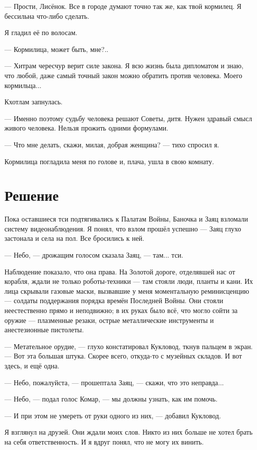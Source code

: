 --- Прости, Лисёнок.
Все в городе думают точно так же, как твой кормилец.
Я бессильна что-либо сделать.

Я гладил её по волосам.

--- Кормилица, может быть, мне?..

--- Хитрам чересчур верит силе закона.
Я всю жизнь была дипломатом и знаю, что любой, даже самый точный закон можно обратить против человека.
Моего кормильца...

Кхотлам запнулась.

--- Именно поэтому судьбу человека решают Советы, дитя.
Нужен здравый смысл живого человека.
Нельзя прожить одними формулами.

--- Что мне делать, скажи, милая, добрая женщина? --- тихо спросил я.

Кормилица погладила меня по голове и, плача, ушла в свою комнату.

\section{Решение}

Пока оставшиеся тси подтягивались к Палатам Войны, Баночка и Заяц взломали систему видеонаблюдения.
Я понял, что взлом прошёл успешно --- Заяц глухо застонала и села на пол.
Все бросились к ней.

--- Небо, --- дрожащим голосом сказала Заяц, --- там... тси.

Наблюдение показало, что она права.
На Золотой дороге, отделявшей нас от корабля, ждали не только роботы-техники --- там стояли люди, планты и кани.
Их лица скрывали газовые маски, вызвавшие у меня моментальную реминисценцию --- солдаты поддержания порядка времён Последней Войны.
Они стояли неестественно прямо и неподвижно;
в их руках было всё, что могло сойти за оружие --- плазменные резаки, острые металлические инструменты и анестезионные пистолеты.

--- Метательное орудие, --- глухо констатировал Кукловод, ткнув пальцем в экран.
--- Вот эта большая штука.
Скорее всего, откуда-то с музейных складов.
И вот здесь, и ещё одна.

--- Небо, пожалуйста, --- прошептала Заяц, --- скажи, что это неправда...

--- Небо, --- подал голос Комар, --- мы должны узнать, как им помочь.

--- И при этом не умереть от руки одного из них, --- добавил Кукловод.

Я взглянул на друзей.
Они ждали моих слов.
Никто из них больше не хотел брать на себя ответственность.
И я вдруг понял, что не могу их винить.

